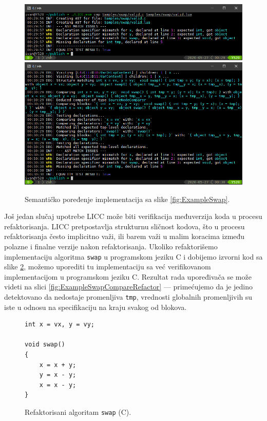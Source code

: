 \begin{figure}[h!]
\centering
\includegraphics[scale=0.7]{images/eval/cmp_rewrite.png}
\includegraphics[scale=0.7]{images/eval/cmp_rewrite_v.png}
\caption{Semantičko poređenje implementacija sa slike \ref{fig:ExampleSwap}.}
\label{fig:ExampleSwapCompareValidRewrite}
\end{figure}

Još jedan slučaj upotrebe LICC može biti verifikacija međuverzija koda u procesu refaktorisanja. LICC pretpostavlja strukturnu sličnost kodova, što u procesu refaktorisanja često implicitno važi, ili barem važi u malim koracima između polazne i finalne verzije nakon refaktorisanja. Ukoliko refaktorišemo implementaciju algoritma \texttt{swap} u programskom jeziku C i dobijemo izvorni kod sa slike \ref{fig:ExampleSwapRefactor}, možemo uporediti tu implementaciju sa već verifikovanom implementacijom u programskom jeziku C. Rezultat rada upoređivača se može videti na slici \ref{fig:ExampleSwapCompareRefactor} --- primećujemo da je jedino detektovano da nedostaje promenljiva \texttt{tmp}, vrednosti globalnih promenljivih su iste u odnosu na specifikaciju na kraju svakog od blokova.

\begin{figure}[h!]
\begin{lstlisting}
int x = vx, y = vy;

void swap() 
{
    x = x + y;
	y = x - y;
	x = x - y;
}
\end{lstlisting}
\caption{Refaktorisani algoritam \texttt{swap} (C).}
\label{fig:ExampleSwapRefactor}
\end{figure}

